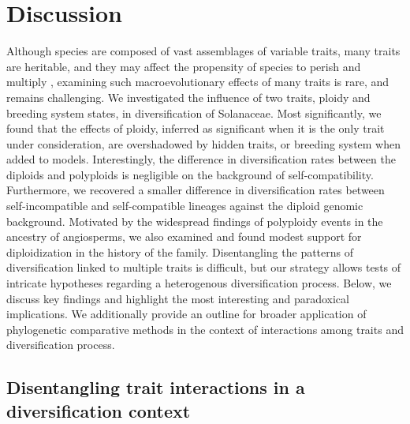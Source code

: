 \section{Discussion}

%
Although species are composed of vast assemblages of variable traits, many traits are heritable, and they may affect the propensity of species to perish and multiply \citep{lewontin_1970}, examining such macroevolutionary effects of many traits is rare, and remains challenging.
We investigated the influence of two traits, ploidy and breeding system states, in diversification of Solanaceae.
Most significantly, we found that the effects of ploidy, inferred as significant when it is the only trait under consideration, are overshadowed by hidden traits, or breeding system when added to models.  %
Interestingly, the difference in diversification rates between the diploids and polyploids is negligible on the background of self-compatibility.
Furthermore, we recovered a smaller difference in diversification rates between self-incompatible and self-compatible lineages against the diploid genomic background.
Motivated by the widespread findings of polyploidy events in the ancestry of angiosperms, we also examined and found modest support for diploidization in the history of the family. %
Disentangling the patterns of diversification linked to multiple traits is difficult, but our strategy allows tests of intricate hypotheses regarding a heterogenous diversification process.
Below, we discuss key findings and highlight the most interesting and paradoxical implications.
We additionally provide an outline for broader application of phylogenetic comparative methods in the context of interactions among traits and diversification process.

\subsection*{Disentangling trait interactions in a diversification context} %

